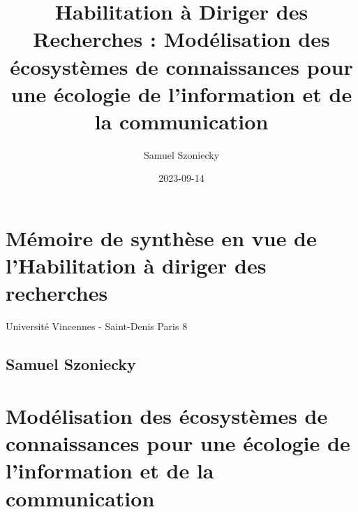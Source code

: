 \documentclass[
  letterpaper,
  DIV=11,
  numbers=noendperiod]{scrreprt}
\title{Habilitation à Diriger des Recherches : Modélisation des
écosystèmes de connaissances pour une écologie de l'information et de la
communication}
\author{Samuel Szoniecky}
\date{2023-09-14}
\renewcommand*\contentsname{Table of contents}
\newcommand\contentsname{Table of contents}
\begin{document}
\maketitle
\ifdefined\Shaded\renewenvironment{Shaded}{\begin{tcolorbox}[interior hidden, enhanced, frame hidden, sharp corners, breakable, boxrule=0pt, borderline west={3pt}{0pt}{shadecolor}]}{\end{tcolorbox}}\fi

\renewcommand*\contentsname{Table of contents}
{
\hypersetup{linkcolor=}
\setcounter{tocdepth}{3}
\tableofcontents
}

\hypertarget{memoire-de-synthese-en-vue-de-lhabilitation-a-diriger-des-recherches}{%
\chapter*{Mémoire de synthèse en vue de l'Habilitation à diriger des
recherches}\label{memoire-de-synthese-en-vue-de-lhabilitation-a-diriger-des-recherches}}


Université Vincennes - Saint-Denis Paris 8

\hypertarget{samuel-szoniecky}{%
\section*{Samuel Szoniecky}\label{samuel-szoniecky}}



\hypertarget{moduxe9lisation-des-uxe9cosystuxe8mes-de-connaissances-pour-une-uxe9cologie-de-linformation-et-de-la-communication}{%
\chapter*{Modélisation des écosystèmes de connaissances pour une
écologie de l'information et de la
communication}\label{moduxe9lisation-des-uxe9cosystuxe8mes-de-connaissances-pour-une-uxe9cologie-de-linformation-et-de-la-communication}}
\end{document}
